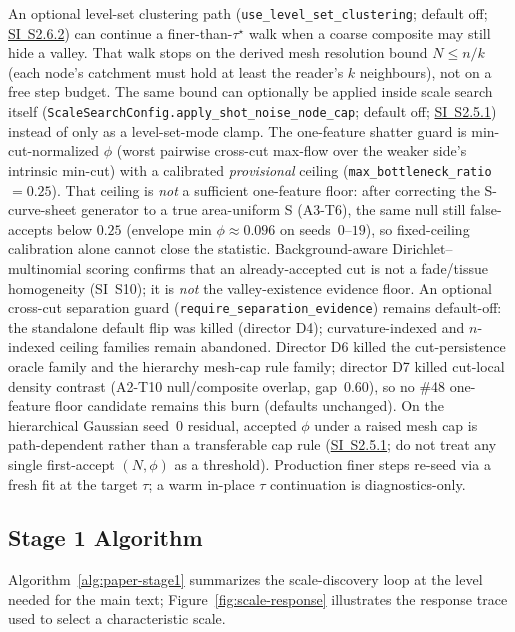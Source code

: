 \documentclass[11pt]{article}
\theoremstyle{definition}
\theoremstyle{plain}
\begin{document}
An optional level-set clustering path (\texttt{use\_level\_set\_clustering}; default off; \hyperref[sec:si-feature-persistence]{SI~S2.6.2}) can continue a finer-than-$\tau^\star$ walk when a coarse composite may still hide a valley. That walk stops on the derived mesh resolution bound $N\le n/k$ (each node's catchment must hold at least the reader's $k$ neighbours), not on a free step budget. The same bound can optionally be applied inside scale search itself (\texttt{ScaleSearchConfig.apply\_shot\_noise\_node\_cap}; default off; \hyperref[sec:si-scale-response]{SI~S2.5.1}) instead of only as a level-set-mode clamp. The one-feature shatter guard is min-cut-normalized $\phi$ (worst pairwise cross-cut max-flow over the weaker side's intrinsic min-cut) with a calibrated \emph{provisional} ceiling (\texttt{max\_bottleneck\_ratio}${}=0.25$). That ceiling is \emph{not} a sufficient one-feature floor: after correcting the S-curve-sheet generator to a true area-uniform S (A3-T6), the same null still false-accepts below $0.25$ (envelope min $\phi\approx 0.096$ on seeds~$0$--$19$), so fixed-ceiling calibration alone cannot close the statistic. Background-aware Dirichlet--multinomial scoring confirms that an already-accepted cut is not a fade/tissue homogeneity (SI~S10); it is \emph{not} the valley-existence evidence floor. An optional cross-cut separation guard (\texttt{require\_separation\_evidence}) remains default-off: the standalone default flip was killed (director D4); curvature-indexed and $n$-indexed ceiling families remain abandoned. Director D6 killed the cut-persistence oracle family and the hierarchy mesh-cap rule family; director D7 killed cut-local density contrast (A2-T10 null/composite overlap, gap~$0.60$), so no \#48 one-feature floor candidate remains this burn (defaults unchanged). On the hierarchical Gaussian seed~$0$ residual, accepted $\phi$ under a raised mesh cap is path-dependent rather than a transferable cap rule (\hyperref[sec:si-scale-response]{SI~S2.5.1}; do not treat any single first-accept $(N,\phi)$ as a threshold). Production finer steps re-seed via a fresh fit at the target $\tau$; a warm in-place $\tau$ continuation is diagnostics-only.

\subsection{Stage 1 Algorithm}
Algorithm~\ref{alg:paper-stage1} summarizes the scale-discovery loop at the level needed for the main text; Figure~\ref{fig:scale-response} illustrates the response trace used to select a characteristic scale.
\end{document}
